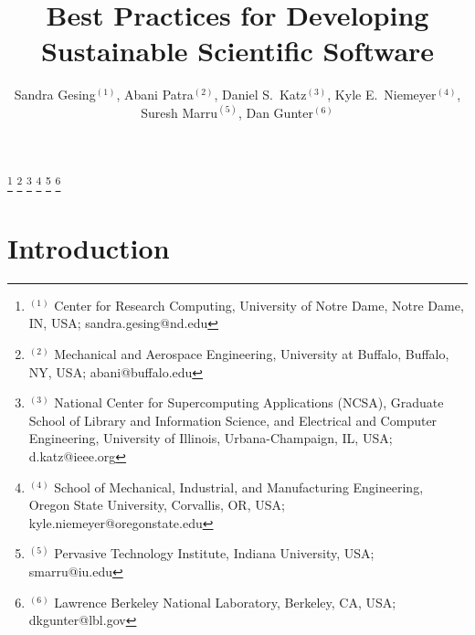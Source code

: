 \documentclass[11pt, oneside]{amsart}
\begin{document}
\title[]{Best Practices for Developing Sustainable Scientific Software}

\author{Sandra Gesing$^{(1)}$,
Abani Patra$^{(2)}$,
Daniel S.\ Katz$^{(3)}$,
Kyle E.\ Niemeyer$^{(4)}$,
Suresh Marru$^{(5)}$,
Dan Gunter$^{(6)}$
}

%
\thanks{{}$^{(1)}$ Center for Research Computing, University of Notre Dame, Notre Dame, IN, USA; sandra.gesing@nd.edu}
%
\thanks{{}$^{(2)}$ Mechanical and Aerospace Engineering, University at Buffalo, Buffalo, NY, USA; abani@buffalo.edu}
%
\thanks{{}$^{(3)}$ National Center for Supercomputing Applications (NCSA), Graduate School of Library and Information Science, and Electrical and Computer Engineering, University of Illinois, Urbana-Champaign, IL, USA; d.katz@ieee.org}
%
\thanks{{}$^{(4)}$ School of Mechanical, Industrial, and Manufacturing Engineering, Oregon State University, Corvallis, OR, USA; kyle.niemeyer@oregonstate.edu}
%
\thanks{{}$^{(5)}$ Pervasive Technology Institute, Indiana University, USA; smarru@iu.edu}
%
\thanks{{}$^{(6)}$ Lawrence Berkeley National Laboratory, Berkeley, CA, USA; dkgunter@lbl.gov}
%
 
\begin{abstract}


\end{abstract}

\maketitle
\newpage

\section{Introduction} \label{sec:intro}
\end{document}
